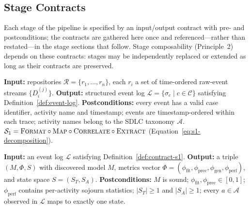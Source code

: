 \subsection{Stage Contracts}
\label{sec:stage-contracts}

Each stage of the pipeline is specified by an input/output contract with
pre- and postconditions; the contracts are gathered here once and
referenced---rather than restated---in the stage sections that follow.
Stage composability (Principle~2) depends on these contracts: stages may
be independently replaced or extended as long as their contracts are
preserved.

\begin{definition}
\label{def:contract-s1}
\textbf{Input:} repositories $\mathcal{R} = \{r_1, \ldots, r_n\}$, each
$r_i$ a set of time-ordered raw-event streams $\{D_i^{(j)}\}$.
\textbf{Output:} structured event log
$\mathcal{L} = \{\sigma_c \mid c \in \mathcal{C}\}$ satisfying
Definition~\ref{def:event-log}.
\textbf{Postconditions:} every event has a valid case identifier,
activity name and timestamp; events are timestamp-ordered within each
trace; activity names belong to the SDLC taxonomy $\mathcal{A}$.
$\mathcal{S}_1 = \textsc{Format} \circ \textsc{Map} \circ
\textsc{Correlate} \circ \textsc{Extract}$
(Equation~\ref{eq:s1-decomposition}).
\end{definition}

\begin{definition}
\label{def:contract-s2}
\textbf{Input:} an event log $\mathcal{L}$ satisfying
Definition~\ref{def:contract-s1}.
\textbf{Output:} a triple $(M, \Phi, S)$ with discovered model $M$,
metrics vector
$\Phi = (\phi_{\text{fit}}, \phi_{\text{prec}}, \phi_{\text{gen}},
\phi_{\text{perf}})$, and state space $S = (S_T, S_A)$.
\textbf{Postconditions:} $M$ is sound;
$\phi_{\text{fit}}, \phi_{\text{prec}} \in [0,1]$; $\phi_{\text{perf}}$
contains per-activity sojourn statistics; $|S_T|\geq 1$ and $|S_A|\geq 1$;
every $a \in \mathcal{A}$ observed in $\mathcal{L}$ maps to exactly one
state.
\end{definition}

